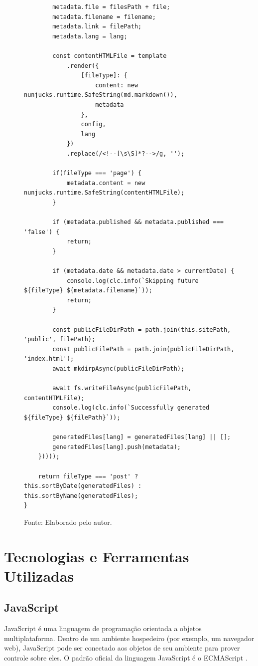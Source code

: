 \documentclass[ppginf, pep]{esinucpel}
\begin{document}
\begin{figure}[htbp]%
    \centering
    \begin{lstlisting}
        metadata.file = filesPath + file;
        metadata.filename = filename;
        metadata.link = filePath;
        metadata.lang = lang;

        const contentHTMLFile = template
            .render({
                [fileType]: {
                    content: new nunjucks.runtime.SafeString(md.markdown()),
                    metadata
                },
                config,
                lang
            })
            .replace(/<!--[\s\S]*?-->/g, '');

        if(fileType === 'page') {
            metadata.content = new nunjucks.runtime.SafeString(contentHTMLFile);
        }

        if (metadata.published && metadata.published === 'false') {
            return;
        }

        if (metadata.date && metadata.date > currentDate) {
            console.log(clc.info(`Skipping future ${fileType} ${metadata.filename}`));
            return;
        }

        const publicFileDirPath = path.join(this.sitePath, 'public', filePath);
        const publicFilePath = path.join(publicFileDirPath, 'index.html');
        await mkdirpAsync(publicFileDirPath);

        await fs.writeFileAsync(publicFilePath, contentHTMLFile);
        console.log(clc.info(`Successfully generated ${fileType} ${filePath}`));

        generatedFiles[lang] = generatedFiles[lang] || [];
        generatedFiles[lang].push(metadata);
    }))));

    return fileType === 'post' ? this.sortByDate(generatedFiles) : this.sortByName(generatedFiles);
}
    \end{lstlisting}
    Fonte: Elaborado pelo autor.
\end{figure}


\chapter{Tecnologias e Ferramentas Utilizadas}

\section{JavaScript}

JavaScript é uma linguagem de programação orientada a objetos multiplataforma. Dentro de um ambiente hospedeiro (por exemplo, um navegador web), JavaScript pode ser conectado aos objetos de seu ambiente para prover controle sobre eles. O padrão oficial da linguagem JavaScript é o ECMAScript \cite{mdn_js_intro}.
\end{document}
